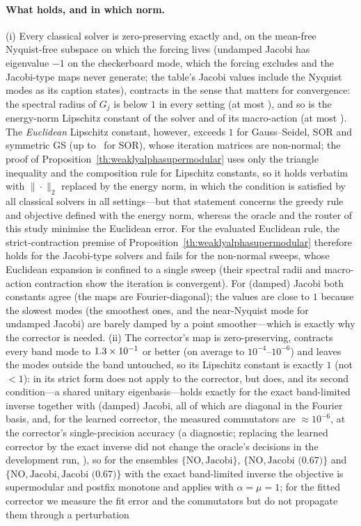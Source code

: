 \paragraph{What holds, and in which norm.} (i) Every classical solver is zero-preserving exactly and, on the mean-free Nyquist-free subspace on which the forcing lives (undamped Jacobi has eigenvalue $-1$ on the checkerboard mode, which the forcing excludes and the Jacobi-type maps never generate; the table's Jacobi values include the Nyquist modes as its caption states), contracts in the sense that matters for convergence: the spectral radius of $G_j$ is below $1$ in every setting (at most \caRhoSpecMax), and so is the energy-norm Lipschitz constant of the solver and of its macro-action (at most \caRhoAMax). The \emph{Euclidean} Lipschitz constant, however, exceeds $1$ for Gauss--Seidel, SOR and symmetric GS (up to \caRhoTwoGsMax\ for SOR), whose iteration matrices are non-normal; the proof of Proposition~\ref{th:weaklyalphasupermodular} uses only the triangle inequality and the composition rule for Lipschitz constants, so it holds verbatim with $\|\cdot\|_2$ replaced by the energy norm, in which the condition is satisfied by all classical solvers in all settings---but that statement concerns the greedy rule and objective defined with the energy norm, whereas the oracle and the router of this study minimise the Euclidean error. For the evaluated Euclidean rule, the strict-contraction premise of Proposition~\ref{th:weaklyalphasupermodular} therefore holds for the Jacobi-type solvers and fails for the non-normal sweeps, whose Euclidean expansion is confined to a single sweep (their spectral radii and macro-action contraction show the iteration is convergent). For (damped) Jacobi both constants agree (the maps are Fourier-diagonal); the values are close to $1$ because the slowest modes (the smoothest ones, and the near-Nyquist mode for undamped Jacobi) are barely damped by a point smoother---which is exactly why the corrector is needed. (ii) The corrector's map is zero-preserving, contracts every band mode to $1.3\times 10^{-1}$ or better (on average to $10^{-4}$--$10^{-6}$) and leaves the modes outside the band untouched, so its Lipschitz constant is exactly $1$ (not $<1$):  in its strict form does not apply to the corrector, but  does, and its second condition---a shared unitary eigenbasis---holds exactly for the exact band-limited inverse together with (damped) Jacobi, all of which are diagonal in the Fourier basis, and, for the learned corrector, the measured commutators are $\approx 10^{-6}$, at the corrector's single-precision accuracy (a diagnostic; replacing the learned corrector by the exact inverse did not change the oracle's decisions in the development run, ), so for the ensembles $\{\mathrm{NO}, \text{Jacobi}\}$, $\{\mathrm{NO}, \text{Jacobi (0.67)}\}$ and $\{\mathrm{NO}, \text{Jacobi}, \text{Jacobi (0.67)}\}$ with the exact band-limited inverse the objective is supermodular and postfix monotone and  applies with $\alpha = \mu = 1$; for the fitted corrector we measure the fit error and the commutators but do not propagate them through a perturbation 